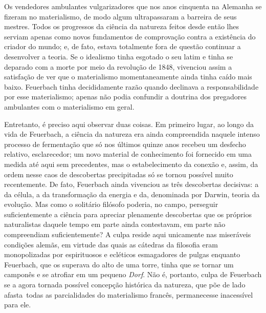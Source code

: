 Os vendedores ambulantes vulgarizadores que nos anos cinquenta na %
Alemanha se fizeram no materialismo, de modo algum ultrapassaram a
barreira de seus mestres. Todos os progressos da ciência da natureza
feitos desde então lhes serviam apenas como novos fundamentos de
comprovação contra a existência do criador do mundo; e, de fato, estava
totalmente fora de questão continuar a desenvolver a teoria. Se o
idealismo tinha esgotado o seu latim e tinha se deparado com a morte por %
meio da revolução de 1848, vivenciou assim a satisfação de ver que o
materialismo momentaneamente ainda tinha caído mais %
baixo. Feuerbach tinha
decididamente razão quando declinava a responsabilidade por esse
materialismo; apenas não podia confundir a doutrina dos pregadores %
ambulantes com o materialismo em geral.

Entretanto, é preciso aqui observar duas coisas. Em primeiro lugar, ao
longo da vida
de Feuerbach,
a ciência da natureza era ainda compreendida naquele intenso processo de
fermentação que só nos últimos quinze anos recebeu um desfecho relativo, %
esclarecedor; um novo material de conhecimento foi fornecido em uma
medida até aqui sem precedentes, mas o estabelecimento
da conexão e, assim, da ordem nesse caos de 
descobertas precipitadas só se tornou possível muito recentemente. De
fato,
 Feuerbach ainda
vivenciou as três descobertas decisivas: a da célula, a da
transformação da energia e da, denominada %
por Darwin,
teoria da evolução. Mas como o solitário
filósofo poderia, no campo, perseguir suficientemente a ciência para %
apreciar plenamente descobertas que os próprios naturalistas daquele
tempo em parte ainda contestavam, em parte não compreendiam %
suficientemente? A culpa reside aqui unicamente nas miseráveis condições
alemãs, em virtude das quais as cátedras da filosofia eram monopolizadas %
por espirituosos e ecléticos esmagadores de pulgas
enquanto Feuerbach,
que os superava do alto de uma torre, tinha que se tornar um camponês e
se atrofiar em um pequeno \emph{Dorf}. Não é, portanto, culpa %
de Feuerbach
se a agora tornada possível concepção histórica da natureza, que põe de %
lado \textbar{}\,afasta\,\textbar{} todas as parcialidades do materialismo francês,
permanecesse inacessível para ele.

